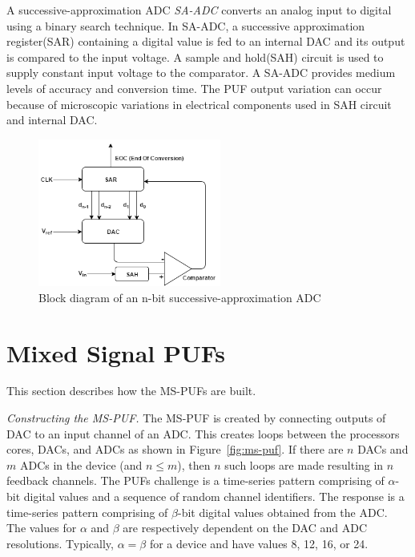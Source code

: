 A successive-approximation ADC {\em SA-ADC} converts an analog
input to digital using a binary search technique.
In SA-ADC, a successive approximation register(SAR) containing 
a digital value is fed to an internal DAC and its output is 
compared to the input voltage. A sample and hold(SAH) circuit 
is used to supply constant input voltage to the comparator. 
A SA-ADC provides medium levels of accuracy and conversion time. 
The PUF output variation can occur because of microscopic variations 
in electrical components used in SAH circuit and internal DAC.
\begin{figure}[h]
\includegraphics[width=6cm]{SA-ADC.png}
\centering
\caption{Block diagram of an n-bit successive-approximation ADC}
\end{figure}


\section{Mixed Signal PUFs}
This section describes how the MS-PUFs are built.

{\flushleft \em Constructing the MS-PUF. }
The MS-PUF is created by connecting outputs of DAC to an
input channel of an ADC. This creates loops between the processors
cores, DACs, and ADCs as shown in Figure~\ref{fig:ms-puf}.
If there are $n$ DACs and $m$ ADCs in the device
(and $n \le m$), then $n$ such loops are made resulting in $n$ feedback channels.
The PUFs challenge is a time-series pattern comprising of
$\alpha$-bit digital values and a sequence of random channel identifiers.
The response is a time-series pattern comprising of $\beta$-bit digital 
values obtained from the ADC. The values for $\alpha$ and $\beta$ are
respectively dependent on the DAC and ADC resolutions. Typically, $\alpha = \beta$
for a device and have values 8, 12, 16, or 24.

